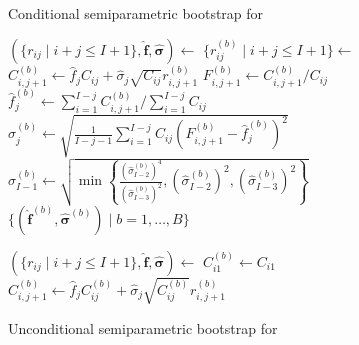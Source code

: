 \documentclass[a4paper]{book}
\begin{document}
\begin{figure}[p]
  \begin{algorithm}[H]
    \caption{Conditional semiparametric bootstrap for }
    \label{alg:cond-semiparam-mack}
    \begin{algorithmic}
      \State $(\{ r_{ij} \mid i + j \leq I + 1 \}, \bm{\widehat{f}}, \bm{\widehat{\sigma}}) \gets$ 
        \State $\{ r^{(b)}_{ij} \mid i + j \leq I + 1 \} \gets$ 
            \State $C^{(b)}_{i, j + 1} \gets \widehat{f}_j C_{ij} + \widehat{\sigma}_j \sqrt{C_{ij}} r^{(b)}_{i, j + 1}$
            \State $\displaystyle F^{(b)}_{i, j + 1} \gets C^{(b)}_{i, j + 1} / C_{ij}$
          \EndFor
          \State $\widehat{f}^{(b)}_j \gets \sum_{i = 1}^{I - j} C^{(b)}_{i, j + 1} / \sum_{i = 1}^{I - j} C_{ij}$
            \State $\displaystyle \widehat{\sigma}^{(b)}_j \gets \sqrt{\frac{1}{I - j - 1}\sum_{i = 1}^{I - j} C_{ij} \left( F^{(b)}_{i, j + 1} - \widehat{f}^{(b)}_j \right)^2}$
          \Else
            \State $\widehat{\sigma}^{(b)}_{I - 1} \gets \sqrt{\min{ \left \{ \displaystyle \frac{(\widehat{\sigma}^{(b)}_{I - 2})^4}{(\widehat{\sigma}^{(b)}_{I - 3})^2}, (\widehat{\sigma}^{(b)}_{I - 2})^2, (\widehat{\sigma}^{(b)}_{I - 3})^2 \right \} }}$
          \EndIf
        \EndFor
      \EndFor
      \State \Return $\{ (\widehat{\bm{f}}^{(b)}, \widehat{\bm{\sigma}}^{(b)}) \mid b = 1, \dots, B \}$
    \end{algorithmic}
  \end{algorithm}
  \begin{algorithm}[H]
    \caption{Unconditional semiparametric bootstrap for }
    \label{alg:uncond-semiparam-mack}
    \begin{algorithmic}
      \State $(\{ r_{ij} \mid i + j \leq I + 1 \}, \bm{\widehat{f}}, \bm{\widehat{\sigma}}) \gets$ 
          \State $C^{(b)}_{i1} \gets C_{i1}$
        \EndFor
            \State $C^{(b)}_{i, j + 1} \gets \widehat{f}_j C^{(b)}_{ij} + \widehat{\sigma}_j \sqrt{C^{(b)}_{ij}} r^{(b)}_{i, j + 1}$

\end{algorithmic}
\end{algorithm}
\end{figure}
\end{document}
